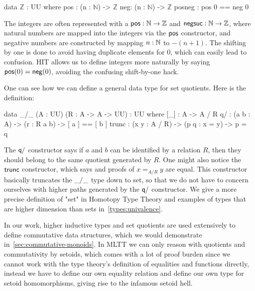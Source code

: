 \vspace{-1em}
\begin{code}
data $\mathbb{Z}$ : UU where
    pos : (n : $\mathbb{N}$) -> $\mathbb{Z}$
    neg: (n : $\mathbb{N}$) -> $\mathbb{Z}$
    posneg : pos 0 == neg 0
\end{code}
\vspace{1em}

The integers are often represented with a $\operatorname{\mathsf{pos}} : \mathbb{N} \to \mathbb{Z}$
and $\operatorname{\mathsf{negsuc}} : \mathbb{N} \to \mathbb{Z}$, where natural numbers
are mapped into the integers via the $\operatorname{\mathsf{pos}}$ constructor, and negative numbers are constructed
by mapping $n : \mathbb{N}$ to $-(n + 1)$. The shifting by one is done to avoid having duplicate elements
for 0, which can easily lead to confusion. HIT allows us to define integers more naturally by saying
$\operatorname{\mathsf{pos}}(0) = \operatorname{\mathsf{neg}}(0)$, avoiding the confusing shift-by-one hack.

One can see how we can define a general data type for set quotients. Here is the definition:
\vspace{-1em}
\begin{code}
data _/_ (A : UU) (R : A -> A -> UU) : UU where
    [_]  : A -> A / R
    q/ : (a b : A) -> (r : R a b) -> [ a ] == [ b ]
    trunc : (x y : A / R) -> (p q : x = y) -> p = q
\end{code}
\vspace{1em}

The $\operatorname{\mathsf{q/}}$ constructor says if $a$ and $b$ can be identified by a relation $R$, then
they should belong to the same quotient generated by $R$.
One might also notice the $\operatorname{\mathsf{trunc}}$ constructor, which says and proofs of $x =_{A/R} y$ are equal.
This constructor basically truncates the $\operatorname{\mathsf{\_/\_}}$ type down to set, so that we do not have to
concern ourselves with higher paths generated by the $\operatorname{\mathsf{q/}}$ constructor.
We give a more precise definition of "set" in Homotopy Type Theory and examples of types that are
higher dimension than sets in~\cref{types:univalence}.

In our work, higher inductive types and set quotients are used extensively to define commutative
data structures, which we would demonstrate in~\cref{sec:commutative-monoids}. In MLTT we can only
reason with quotients and commutativity by setoids, which comes with a lot of proof burden
since we cannot work with the type theory's definition of equalities and functions directly,
instead we have to define our own equality relation and define our own type for setoid homomorphisms,
giving rise to the infamous setoid hell.

